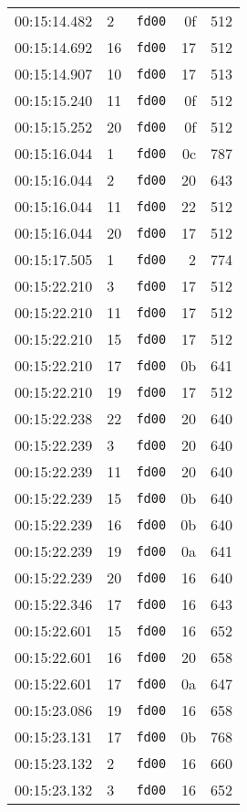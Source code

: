 \documentclass{article}
\begin{document}
\begin{longtable}{lllrr}
00:15:14.482 & 2 & \texttt{fd00} & 0f & 512 \\
00:15:14.692 & 16 & \texttt{fd00} & 17 & 512 \\
00:15:14.907 & 10 & \texttt{fd00} & 17 & 513 \\
00:15:15.240 & 11 & \texttt{fd00} & 0f & 512 \\
00:15:15.252 & 20 & \texttt{fd00} & 0f & 512 \\
00:15:16.044 & 1 & \texttt{fd00} & 0c & 787 \\
00:15:16.044 & 2 & \texttt{fd00} & 20 & 643 \\
00:15:16.044 & 11 & \texttt{fd00} & 22 & 512 \\
00:15:16.044 & 20 & \texttt{fd00} & 17 & 512 \\
00:15:17.505 & 1 & \texttt{fd00} & 2 & 774 \\
00:15:22.210 & 3 & \texttt{fd00} & 17 & 512 \\
00:15:22.210 & 11 & \texttt{fd00} & 17 & 512 \\
00:15:22.210 & 15 & \texttt{fd00} & 17 & 512 \\
00:15:22.210 & 17 & \texttt{fd00} & 0b & 641 \\
00:15:22.210 & 19 & \texttt{fd00} & 17 & 512 \\
00:15:22.238 & 22 & \texttt{fd00} & 20 & 640 \\
00:15:22.239 & 3 & \texttt{fd00} & 20 & 640 \\
00:15:22.239 & 11 & \texttt{fd00} & 20 & 640 \\
00:15:22.239 & 15 & \texttt{fd00} & 0b & 640 \\
00:15:22.239 & 16 & \texttt{fd00} & 0b & 640 \\
00:15:22.239 & 19 & \texttt{fd00} & 0a & 641 \\
00:15:22.239 & 20 & \texttt{fd00} & 16 & 640 \\
00:15:22.346 & 17 & \texttt{fd00} & 16 & 643 \\
00:15:22.601 & 15 & \texttt{fd00} & 16 & 652 \\
00:15:22.601 & 16 & \texttt{fd00} & 20 & 658 \\
00:15:22.601 & 17 & \texttt{fd00} & 0a & 647 \\
00:15:23.086 & 19 & \texttt{fd00} & 16 & 658 \\
00:15:23.131 & 17 & \texttt{fd00} & 0b & 768 \\
00:15:23.132 & 2 & \texttt{fd00} & 16 & 660 \\
00:15:23.132 & 3 & \texttt{fd00} & 16 & 652 \\

\end{longtable}
\end{document}
